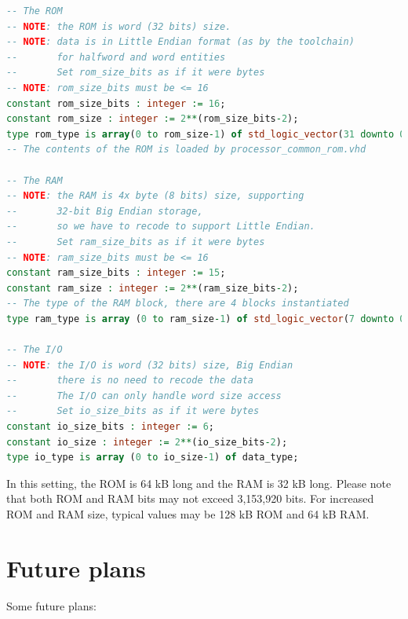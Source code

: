 \documentclass[12pt]{article}
\begin{document}
\begin{lstlisting}[language=VHDL]
-- The ROM
-- NOTE: the ROM is word (32 bits) size.
-- NOTE: data is in Little Endian format (as by the toolchain)
--       for halfword and word entities
--       Set rom_size_bits as if it were bytes
-- NOTE: rom_size_bits must be <= 16
constant rom_size_bits : integer := 16;
constant rom_size : integer := 2**(rom_size_bits-2);
type rom_type is array(0 to rom_size-1) of std_logic_vector(31 downto 0);
-- The contents of the ROM is loaded by processor_common_rom.vhd

-- The RAM
-- NOTE: the RAM is 4x byte (8 bits) size, supporting
--       32-bit Big Endian storage,
--       so we have to recode to support Little Endian.
--       Set ram_size_bits as if it were bytes
-- NOTE: ram_size_bits must be <= 16
constant ram_size_bits : integer := 15;
constant ram_size : integer := 2**(ram_size_bits-2);
-- The type of the RAM block, there are 4 blocks instantiated
type ram_type is array (0 to ram_size-1) of std_logic_vector(7 downto 0);
                    
-- The I/O
-- NOTE: the I/O is word (32 bits) size, Big Endian
--       there is no need to recode the data
--       The I/O can only handle word size access
--       Set io_size_bits as if it were bytes
constant io_size_bits : integer := 6;
constant io_size : integer := 2**(io_size_bits-2);
type io_type is array (0 to io_size-1) of data_type;
\end{lstlisting}

In this setting, the ROM is 64 kB long and the RAM is 32 kB long. Please note that both ROM and RAM bits may not exceed 3,153,920 bits. For increased ROM and RAM size, typical values may be 128 kB ROM and 64 kB RAM.

%
%
%

\section{Future plans}
Some future plans:
\end{document}
